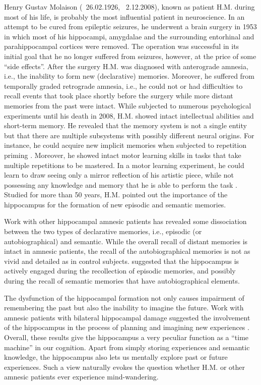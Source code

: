     Henry Gustav Molaison (\textborn~26.02.1926, \textdagger~2.12.2008), known
    as patient H.M. during most of his life, is probably the most influential
    patient in neuroscience. In an attempt to be cured from epileptic seizures,
    he underwent a brain surgery in 1953 in which most of his hippocampi,
    amygdalae and the surrounding entorhinal and parahippocampal cortices were
    removed. The operation was successful in its initial goal that he no longer
    suffered from seizures, however, at the price of some ``side effects''. After
    the surgery H.M. was diagnosed with anterograde amnesia, i.e., the
    inability to form new (declarative) memories. Moreover, he suffered from
    temporally graded retrograde amnesia, i.e., he could not or had
    difficulties to recall events that took place shortly before the surgery
    while more distant memories from the past were intact. While subjected to
    numerous psychological experiments until his death in 2008, H.M. showed
    intact intellectual abilities and short-term memory. He revealed that the
    memory system is not a single entity but that there are multiple subsystems
    with possibly different neural origins. For instance, he could acquire new
    implicit memories when subjected to repetition priming \citep{Corkin2002}.
    Moreover, he showed intact motor learning skills in tasks that take
    multiple repetitions to be mastered. In a motor learning experiment, he could
    learn to draw seeing only a mirror reflection of his artistic piece, while
    not possessing any knowledge and memory that he is able to perform the task
    \citep{Corkin1968}. Studied for more than 50 years, H.M. pointed out the
    importance of the hippocampus for the formation of new episodic and
    semantic memories.

    Work with other hippocampal amnesic patients has revealed some dissociation
    between the two types of declarative memories, i.e., episodic (or
    autobiographical) and semantic. While the overall recall of distant
    memories is intact in amnesic patients, the recall of the autobiographical
    memories is not as vivid and detailed as in control subjects.
    \cite{Moscovitch2005} suggested that the hippocampus is actively engaged
    during the recollection of episodic memories, and possibly during the
    recall of semantic memories that have autobiographical elements.

    The dysfunction of the hippocampal formation not only causes impairment of
    remembering the past but also the inability to imagine the future. Work
    with amnesic patients with bilateral hippocampal damage suggested the
    involvement of the hippocampus in the process of planning and imagining new
    experiences \citep{Klein2002, Hassabis2007}. Overall, these results give
    the hippocampus a very peculiar function as a ``time machine'' in our
    cognition. Apart from simply storing experiences and semantic knowledge,
    the hippocampus also lets us mentally explore past or future experiences.
    Such a view naturally evokes the question whether H.M. or other amnesic
    patients ever experience mind-wandering.

